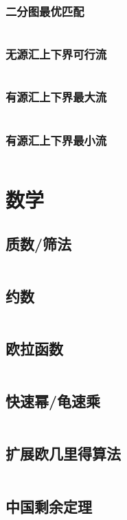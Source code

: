 \documentclass[a4paper,10pt]{article}
\begin{document}
\subsubsection{二分图最优匹配}
\inputminted[breaklines, linenos]{c++}{graph/flow/match.cc}
\subsubsection{无源汇上下界可行流}
\inputminted[breaklines, linenos]{c++}{graph/flow/no_st_flow.cc}
\subsubsection{有源汇上下界最大流}
\inputminted[breaklines, linenos]{c++}{graph/flow/st_maxflow.cc}
\subsubsection{有源汇上下界最小流}
\inputminted[breaklines, linenos]{c++}{graph/flow/st_minflow.cc}

\newpage
\section{数学}
\subsection{质数/筛法}
\inputminted[breaklines, linenos]{c++}{math/prime.cc}
\subsection{约数}
\inputminted[breaklines, linenos]{c++}{math/divisor.cc}
\subsection{欧拉函数}
\inputminted[breaklines, linenos]{c++}{math/eluer.cc}
\subsection{快速幂/龟速乘}
\inputminted[breaklines, linenos]{c++}{math/qmi.cc}
\subsection{扩展欧几里得算法}
\inputminted[breaklines, linenos]{c++}{math/exgcd.cc}
\subsection{中国剩余定理}
\inputminted[breaklines, linenos]{c++}{math/crt.cc}
\end{document}
